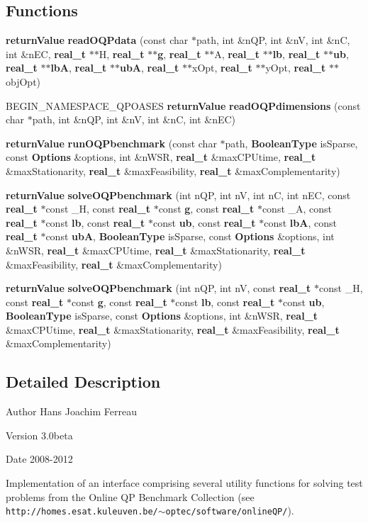 \subsection*{Functions}
\begin{DoxyCompactItemize}
\item 
{\bf returnValue} {\bf readOQPdata} (const char $\ast$path, int \&nQP, int \&nV, int \&nC, int \&nEC, {\bf real\_\-t} $\ast$$\ast$H, {\bf real\_\-t} $\ast$$\ast${\bf g}, {\bf real\_\-t} $\ast$$\ast$A, {\bf real\_\-t} $\ast$$\ast${\bf lb}, {\bf real\_\-t} $\ast$$\ast${\bf ub}, {\bf real\_\-t} $\ast$$\ast${\bf lbA}, {\bf real\_\-t} $\ast$$\ast${\bf ubA}, {\bf real\_\-t} $\ast$$\ast$xOpt, {\bf real\_\-t} $\ast$$\ast$yOpt, {\bf real\_\-t} $\ast$$\ast$objOpt)
\item 
BEGIN\_\-NAMESPACE\_\-QPOASES {\bf returnValue} {\bf readOQPdimensions} (const char $\ast$path, int \&nQP, int \&nV, int \&nC, int \&nEC)
\item 
{\bf returnValue} {\bf runOQPbenchmark} (const char $\ast$path, {\bf BooleanType} isSparse, const {\bf Options} \&options, int \&nWSR, {\bf real\_\-t} \&maxCPUtime, {\bf real\_\-t} \&maxStationarity, {\bf real\_\-t} \&maxFeasibility, {\bf real\_\-t} \&maxComplementarity)
\item 
{\bf returnValue} {\bf solveOQPbenchmark} (int nQP, int nV, int nC, int nEC, const {\bf real\_\-t} $\ast$const \_\-H, const {\bf real\_\-t} $\ast$const {\bf g}, const {\bf real\_\-t} $\ast$const \_\-A, const {\bf real\_\-t} $\ast$const {\bf lb}, const {\bf real\_\-t} $\ast$const {\bf ub}, const {\bf real\_\-t} $\ast$const {\bf lbA}, const {\bf real\_\-t} $\ast$const {\bf ubA}, {\bf BooleanType} isSparse, const {\bf Options} \&options, int \&nWSR, {\bf real\_\-t} \&maxCPUtime, {\bf real\_\-t} \&maxStationarity, {\bf real\_\-t} \&maxFeasibility, {\bf real\_\-t} \&maxComplementarity)
\item 
{\bf returnValue} {\bf solveOQPbenchmark} (int nQP, int nV, const {\bf real\_\-t} $\ast$const \_\-H, const {\bf real\_\-t} $\ast$const {\bf g}, const {\bf real\_\-t} $\ast$const {\bf lb}, const {\bf real\_\-t} $\ast$const {\bf ub}, {\bf BooleanType} isSparse, const {\bf Options} \&options, int \&nWSR, {\bf real\_\-t} \&maxCPUtime, {\bf real\_\-t} \&maxStationarity, {\bf real\_\-t} \&maxFeasibility, {\bf real\_\-t} \&maxComplementarity)
\end{DoxyCompactItemize}


\subsection{Detailed Description}
\begin{DoxyAuthor}{Author}
Hans Joachim Ferreau 
\end{DoxyAuthor}
\begin{DoxyVersion}{Version}
3.0beta 
\end{DoxyVersion}
\begin{DoxyDate}{Date}
2008-\/2012
\end{DoxyDate}
Implementation of an interface comprising several utility functions for solving test problems from the Online QP Benchmark Collection (see {\tt http://homes.esat.kuleuven.be/$\sim$optec/software/onlineQP/}). 

